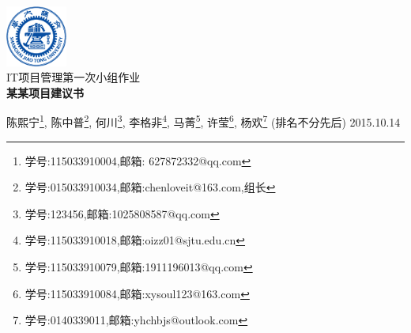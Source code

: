 \begin{titlepage}

\begin{center} 
 
\includegraphics[width=0.15\textwidth]{sjtulogo}\\[1cm]  

\textsc{\Large IT项目管理第一次小组作业}\\[1cm]

{\huge \bfseries 某某项目建议书}\\[0.4cm] 

\vspace*{2\baselineskip}

陈熙宁\footnote{学号:115033910004,邮箱: 627872332@qq.com},
陈中普\footnote{学号:015033910034,邮箱:chenloveit@163.com,组长},
何川\footnote{学号:123456,邮箱:1025808587@qq.com},
李格非\footnote{学号:115033910018,邮箱:oizz01@sjtu.edu.cn},
马菁\footnote{学号:115033910079,邮箱:1911196013@qq.com},
许莹\footnote{学号:115033910084,邮箱:xysoul123@163.com},
杨欢\footnote{学号:0140339011,邮箱:yhchbjs@outlook.com}
(排名不分先后)
\vfill
{\large 2015.10.14}\\[3cm]
\end{center}
\end{titlepage}
